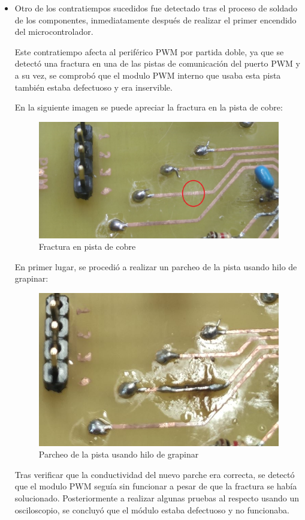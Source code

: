 \begin{itemize}
    \item Otro de los contratiempos sucedidos fue detectado tras el proceso de soldado de los componentes, inmediatamente después de realizar el primer encendido del microcontrolador.
    
    Este contratiempo afecta al periférico PWM por partida doble, ya que se detectó una fractura en una de las pistas de comunicación del puerto PWM y a su vez, se comprobó que el modulo PWM interno que usaba esta pista también estaba defectuoso y era inservible.
    
    En la siguiente imagen se puede apreciar la fractura en la pista de cobre:
    
    \begin{figure}[H]
    \centering 
    \includegraphics[width=0.65\linewidth]{pictures/FracturaPista.jpg}
    \caption{Fractura en pista de cobre}
    \label{fig:kdiagram}
    \end{figure}
    
    En primer lugar, se procedió a realizar un parcheo de la pista usando hilo de grapinar:
    
    \begin{figure}[H]
    \centering 
    \includegraphics[width=0.65\linewidth]{pictures/Parche.jpg}
    \caption{Parcheo de la pista usando hilo de grapinar}
    \label{fig:kdiagram}
    \end{figure}
    
   Tras verificar que la conductividad del nuevo parche era correcta, se detectó que el modulo PWM seguía sin funcionar a pesar de que la fractura se había solucionado. Posteriormente a realizar algunas pruebas al respecto usando un osciloscopio, se concluyó que el módulo estaba defectuoso y no funcionaba.
   

\end{itemize}
